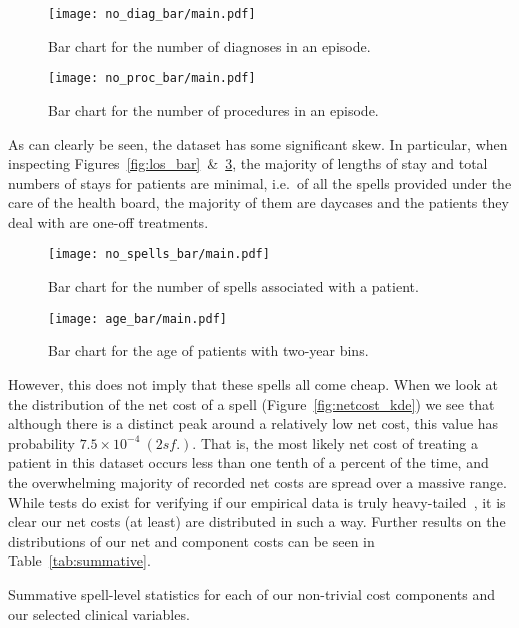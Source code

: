 \begin{figure}[htbp]
    \centering
    \texttt{[image: no\_diag\_bar/main.pdf]}
    \caption{Bar chart for the number of diagnoses in an
        episode.}\label{fig:no_diag_bar}
\end{figure}

\begin{figure}[htbp]
    \centering
    \texttt{[image: no\_proc\_bar/main.pdf]}
    \caption{Bar chart for the number of procedures in an
        episode.}\label{fig:no_proc_bar}
\end{figure}

As can clearly be seen, the dataset has some significant skew. In particular,
when inspecting Figures~\ref{fig:los_bar}~\&~\ref{fig:no_spells_bar},
the majority of lengths of stay and total numbers of stays for patients are
minimal, i.e.\ of all the spells provided under the care of the health board,
the majority of them are daycases and the patients they deal with are one-off
treatments.

\begin{figure}[htbp]
    \centering
    \texttt{[image: no\_spells\_bar/main.pdf]}
    \caption{Bar chart for the number of spells associated with a
        patient.}\label{fig:no_spells_bar}
\end{figure}

\begin{figure}[htbp]
    \centering
    \texttt{[image: age\_bar/main.pdf]}
    \caption{Bar chart for the age of patients with two-year
        bins.}\label{fig:age_bar}
\end{figure}

However, this does not imply that these spells all come cheap. When we look at
the distribution of the net cost of a spell (Figure~\ref{fig:netcost_kde}) we
see that although there is a distinct peak around a relatively low net cost,
this value has probability \(7.5\times10^{-4}\ (2 sf.)\). That is, the most
likely net cost of treating a patient in this dataset occurs less than one tenth
of a percent of the time, and the overwhelming majority of recorded net costs
are spread over a massive range. While tests do exist for verifying if our
empirical data is truly heavy-tailed~\cite{Bryson1974}, it is clear our net
costs (at least) are distributed in such a way. Further results on the
distributions of our net and component costs can be seen in
Table~\ref{tab:summative}.

\begin{table}[htbp!]
    \resizebox{\textwidth}{!}{%
        
    }
    \resizebox{\textwidth}{!}{%
        
    }
    \resizebox{\textwidth}{!}{%
        
    }
    \caption{Summative spell-level statistics for each of our non-trivial cost
    components and our selected clinical variables.}\label{tab:summative}
\end{table}

